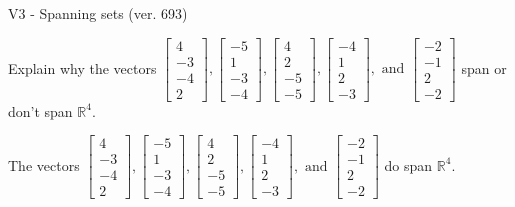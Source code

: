 \begin{exercise}
  \begin{exerciseTitle}V3 - Spanning sets (ver. 693)\end{exerciseTitle}
  \begin{exerciseStatement}
    Explain why the vectors \(\left[\begin{array}{r}
4 \\
-3 \\
-4 \\
2
\end{array}\right] , \left[\begin{array}{r}
-5 \\
1 \\
-3 \\
-4
\end{array}\right] , \left[\begin{array}{r}
4 \\
2 \\
-5 \\
-5
\end{array}\right] , \left[\begin{array}{r}
-4 \\
1 \\
2 \\
-3
\end{array}\right] , \text{ and } \left[\begin{array}{r}
-2 \\
-1 \\
2 \\
-2
\end{array}\right]\) span or don't span \(\mathbb{R}^4\). 
	


  \end{exerciseStatement}
  \begin{exerciseAnswer}
   The vectors \(\left[\begin{array}{r}
4 \\
-3 \\
-4 \\
2
\end{array}\right] , \left[\begin{array}{r}
-5 \\
1 \\
-3 \\
-4
\end{array}\right] , \left[\begin{array}{r}
4 \\
2 \\
-5 \\
-5
\end{array}\right] , \left[\begin{array}{r}
-4 \\
1 \\
2 \\
-3
\end{array}\right] , \text{ and } \left[\begin{array}{r}
-2 \\
-1 \\
2 \\
-2
\end{array}\right]\) 
  	 do  
	span \(\mathbb{R}^4\).
  



\end{exerciseAnswer}
\end{exercise}
